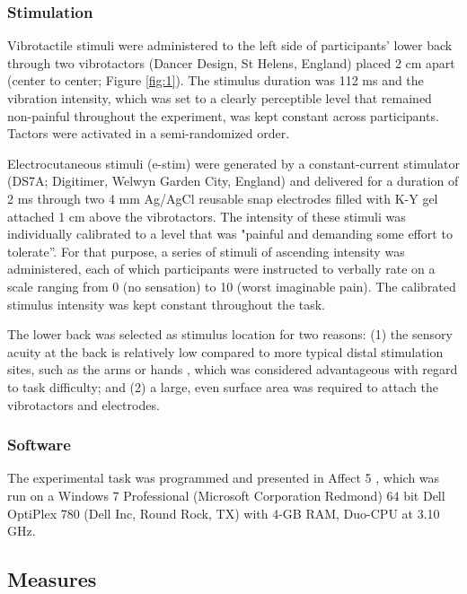 \documentclass[twocolumn, serif, authordate, empirical]{jote-article}
\begin{document}
 {} \subsubsection*{Stimulation} Vibrotactile stimuli were administered to the left side of participants' lower back through two vibrotactors (Dancer Design, St Helens, England) placed 2 cm apart (center to center; Figure \ref{fig:1}). The stimulus duration was 112 ms and the vibration intensity, which was set to a clearly perceptible level that remained non-painful throughout the experiment, was kept constant across participants. Tactors were activated in a semi-randomized order.

Electrocutaneous stimuli (e-stim) were generated by a constant-current stimulator (DS7A; Digitimer, Welwyn Garden City, England) and delivered for a duration of 2 ms through two 4 mm Ag/AgCl reusable snap electrodes filled with K-Y gel attached 1 cm above the vibrotactors. The intensity of these stimuli was individually calibrated to a level that was "painful and demanding some effort to tolerate''. For that purpose, a series of stimuli of ascending intensity was administered, each of which participants were instructed to verbally rate on a scale ranging from 0 (no sensation) to 10 (worst imaginable pain). The calibrated stimulus intensity was kept constant throughout the task.

The lower back was selected as stimulus location for two reasons: (1) the sensory acuity at the back is relatively low compared to more typical distal stimulation sites, such as the arms or hands \parencite{Weissman-Fogel2012}, which was considered advantageous with regard to task difficulty; and (2) a large, even surface area was required to attach the vibrotactors and electrodes.

 {}\subsubsection*{Software} The experimental task was programmed and presented in Affect 5 \parencite{Spruyt2009a}, which was run on a Windows 7 Professional (Microsoft Corporation Redmond) 64 bit Dell OptiPlex 780 (Dell Inc, Round Rock, TX) with 4-GB RAM, Duo-CPU at 3.10 GHz.


 {}\subsection*{Measures} 
\end{document}
